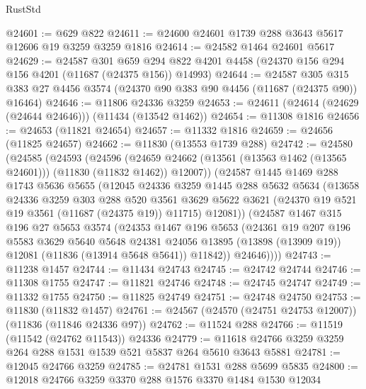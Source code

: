 \begin{lexlean}{RustStd}
\begin{coremodule}
@24601 := @629 @822
@24611 := @24600 @24601 @1739 @288 @3643 @5617 @12606 @19 @3259 @3259 @1816
@24614 := @24582 @1464 @24601 @5617
@24629 := @24587
    @301
    @659
    @294
    @822
    @4201
    @4458
    (@24370 @156 @294 @156 @4201 (@11687 (@24375 @156)) @14993)
@24644 := @24587
    @305
    @315
    @383
    @27
    @4456
    @3574
    (@24370 @90 @383 @90 @4456 (@11687 (@24375 @90)) @16464)
@24646 := @11806 @24336 @3259
@24653 := @24611 (@24614 (@24629 (@24644 @24646))) (@11434 (@13542 @1462))
@24654 := @11308 @1816
@24656 := @24653 (@11821 @24654)
@24657 := @11332 @1816
@24659 := @24656 (@11825 @24657)
@24662 := @11830 (@13553 @1739 @288)
@24742 := @24580
    (@24585
      (@24593
        (@24596
          (@24659 @24662 (@13561 (@13563 @1462 (@13565 @24601))) (@11830 (@11832 @1462)) @12007))
        (@24587
          @1445
          @1469
          @288
          @1743
          @5636
          @5655
          (@12045
            @24336
            @3259
            @1445
            @288
            @5632
            @5634
            (@13658
              @24336
              @3259
              @303
              @288
              @520
              @3561
              @3629
              @5622
              @3621
              (@24370 @19 @521 @19 @3561 (@11687 (@24375 @19)) @11715)
              @12081))
          (@24587
            @1467
            @315
            @196
            @27
            @5653
            @3574
            (@24353
              @1467
              @196
              @5653
              (@24361
                @19
                @207
                @196
                @5583
                @3629
                @5640
                @5648
                @24381
                @24056
                @13895
                (@13898 (@13909 @19))
                @12081
                (@11836 (@13914 @5648 @5641))
                @11842))
            @24646))))
@24743 := @11238 @1457
@24744 := @11434 @24743
@24745 := @24742 @24744
@24746 := @11308 @1755
@24747 := @11821 @24746
@24748 := @24745 @24747
@24749 := @11332 @1755
@24750 := @11825 @24749
@24751 := @24748 @24750
@24753 := @11830 (@11832 @1457)
@24761 := @24567 (@24570 (@24751 @24753 @12007)) (@11836 (@11846 @24336 @97))
@24762 := @11524 @288
@24766 := @11519 (@11542 (@24762 @11543)) @24336
@24779 := @11618 @24766 @3259 @3259 @264 @288 @1531 @1539 @521 @5837 @264 @5610 @3643 @5881
@24781 := @12045 @24766 @3259
@24785 := @24781 @1531 @288 @5699 @5835
@24800 := @12018
    @24766
    @3259
    @3370
    @288
    @1576
    @3370
    @1484
    @1530
    @12034

\end{coremodule}
\end{lexlean}
